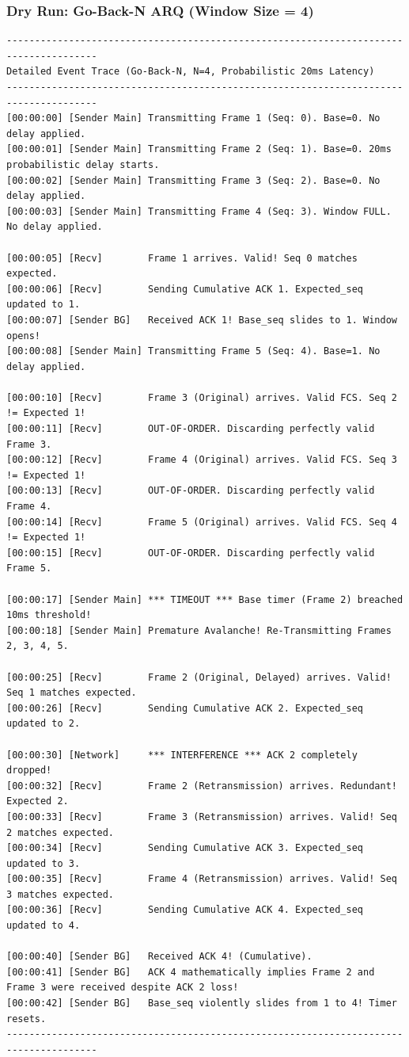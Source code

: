 \documentclass[12pt, a4paper]{article}
\begin{document}
\subsubsection{Dry Run: Go-Back-N ARQ (Window Size = 4)}

\begin{scriptsize}
\begin{verbatim}
--------------------------------------------------------------------------------------
Detailed Event Trace (Go-Back-N, N=4, Probabilistic 20ms Latency)
--------------------------------------------------------------------------------------
[00:00:00] [Sender Main] Transmitting Frame 1 (Seq: 0). Base=0. No delay applied.
[00:00:01] [Sender Main] Transmitting Frame 2 (Seq: 1). Base=0. 20ms probabilistic delay starts.
[00:00:02] [Sender Main] Transmitting Frame 3 (Seq: 2). Base=0. No delay applied.
[00:00:03] [Sender Main] Transmitting Frame 4 (Seq: 3). Window FULL. No delay applied.

[00:00:05] [Recv]        Frame 1 arrives. Valid! Seq 0 matches expected.
[00:00:06] [Recv]        Sending Cumulative ACK 1. Expected_seq updated to 1.
[00:00:07] [Sender BG]   Received ACK 1! Base_seq slides to 1. Window opens!
[00:00:08] [Sender Main] Transmitting Frame 5 (Seq: 4). Base=1. No delay applied.

[00:00:10] [Recv]        Frame 3 (Original) arrives. Valid FCS. Seq 2 != Expected 1! 
[00:00:11] [Recv]        OUT-OF-ORDER. Discarding perfectly valid Frame 3.
[00:00:12] [Recv]        Frame 4 (Original) arrives. Valid FCS. Seq 3 != Expected 1!
[00:00:13] [Recv]        OUT-OF-ORDER. Discarding perfectly valid Frame 4.
[00:00:14] [Recv]        Frame 5 (Original) arrives. Valid FCS. Seq 4 != Expected 1!
[00:00:15] [Recv]        OUT-OF-ORDER. Discarding perfectly valid Frame 5.

[00:00:17] [Sender Main] *** TIMEOUT *** Base timer (Frame 2) breached 10ms threshold!
[00:00:18] [Sender Main] Premature Avalanche! Re-Transmitting Frames 2, 3, 4, 5.

[00:00:25] [Recv]        Frame 2 (Original, Delayed) arrives. Valid! Seq 1 matches expected.
[00:00:26] [Recv]        Sending Cumulative ACK 2. Expected_seq updated to 2.

[00:00:30] [Network]     *** INTERFERENCE *** ACK 2 completely dropped!
[00:00:32] [Recv]        Frame 2 (Retransmission) arrives. Redundant! Expected 2.
[00:00:33] [Recv]        Frame 3 (Retransmission) arrives. Valid! Seq 2 matches expected. 
[00:00:34] [Recv]        Sending Cumulative ACK 3. Expected_seq updated to 3.
[00:00:35] [Recv]        Frame 4 (Retransmission) arrives. Valid! Seq 3 matches expected. 
[00:00:36] [Recv]        Sending Cumulative ACK 4. Expected_seq updated to 4.

[00:00:40] [Sender BG]   Received ACK 4! (Cumulative). 
[00:00:41] [Sender BG]   ACK 4 mathematically implies Frame 2 and Frame 3 were received despite ACK 2 loss!
[00:00:42] [Sender BG]   Base_seq violently slides from 1 to 4! Timer resets.
--------------------------------------------------------------------------------------
\end{verbatim}
\end{scriptsize}
\end{document}
